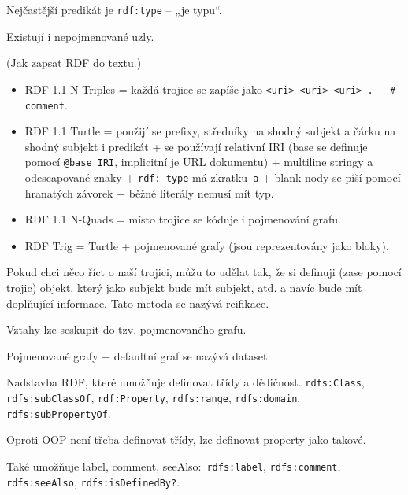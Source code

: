 \documentclass[12pt]{article}					%
\begin{document}
\begin{priklady}
	Nejčastější predikát je \verb|rdf:type| -- „je typu“.
\end{priklady}

\begin{definice}
	Existují i nepojmenované uzly.
\end{definice}

\begin{definice}
	(Jak zapsat RDF do textu.)

	\begin{itemize}
		\item RDF 1.1 N-Triples = každá trojice se zapíše jako \verb|<uri> <uri> <uri> .   # comment|.
		\item RDF 1.1 Turtle = použijí se prefixy, středníky na shodný subjekt a čárku na shodný subjekt i predikát + se používají relativní IRI (base se definuje pomocí \verb|@base IRI|, implicitní je URL dokumentu) + multiline stringy a odescapované znaky + \verb|rdf: type| má zkratku \verb|a| + blank nody se píší pomocí hranatých závorek + běžné literály nemusí mít typ.
		\item RDF 1.1 N-Quads = místo trojice se kóduje i pojmenování grafu.
		\item RDF Trig = Turtle + pojmenované grafy (jsou reprezentovány jako bloky).
	\end{itemize}
\end{definice}

\begin{definice}[Reifikace]
	Pokud chci něco říct o naší trojici, můžu to udělat tak, že si definuji (zase pomocí trojic) objekt, který jako subjekt bude mít subjekt, atd. a navíc bude mít doplňující informace. Tato metoda se nazývá reifikace.
\end{definice}

\begin{definice}
	Vztahy lze seskupit do tzv. pojmenovaného grafu.

	Pojmenované grafy + defaultní graf se nazývá dataset.
\end{definice}

\begin{definice}[RDFS]
	Nadstavba RDF, které umožňuje definovat třídy a dědičnost. \verb|rdfs:Class|, \verb|rdfs:subClassOf|, \verb|rdf:Property|, \verb|rdfs:range|, \verb|rdfs:domain|, \verb|rdfs:subPropertyOf|.

	Oproti OOP není třeba definovat třídy, lze definovat property jako takové.

	Také umožňuje label, comment, seeAlso: \verb|rdfs:label|, \verb|rdfs:comment|, \verb|rdfs:seeAlso|, \verb|rdfs:isDefinedBy?|.
\end{definice}
\end{document}
